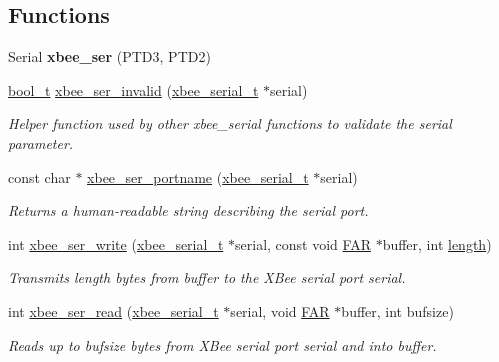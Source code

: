 \subsection*{Functions}
\begin{DoxyCompactItemize}
\item 
\mbox{\label{group__hal__kl25_ga2db648c8306d8b82c5e548096738428f}} 
Serial {\bfseries xbee\+\_\+ser} (P\+T\+D3, P\+T\+D2)
\item 
\hyperlink{group__hal__dos_ga04dd5074964518403bf944f2b240a5f8}{bool\+\_\+t} \hyperlink{group__hal__kl25_ga9bf21a5b024e4919bbe8b605c8f45351}{xbee\+\_\+ser\+\_\+invalid} (\hyperlink{structxbee__serial__t}{xbee\+\_\+serial\+\_\+t} $\ast$serial)
\begin{DoxyCompactList}\small\item\em Helper function used by other xbee\+\_\+serial functions to validate the {\itshape serial} parameter. \end{DoxyCompactList}\item 
const char $\ast$ \hyperlink{group__hal__kl25_ga898057d1b7645785e7f3d6256828d039}{xbee\+\_\+ser\+\_\+portname} (\hyperlink{structxbee__serial__t}{xbee\+\_\+serial\+\_\+t} $\ast$serial)
\begin{DoxyCompactList}\small\item\em Returns a human-\/readable string describing the serial port. \end{DoxyCompactList}\item 
int \hyperlink{group__hal__kl25_ga2ca4e60c9d642084afa52dff9e1f6be4}{xbee\+\_\+ser\+\_\+write} (\hyperlink{structxbee__serial__t}{xbee\+\_\+serial\+\_\+t} $\ast$serial, const void \hyperlink{group__hal_gaef060b3456fdcc093a7210a762d5f2ed}{F\+AR} $\ast$buffer, int \hyperlink{group__zdo_gab2b3adeb2a67e656ff030b56727fd0ac}{length})
\begin{DoxyCompactList}\small\item\em Transmits {\itshape length} bytes from {\itshape buffer} to the X\+Bee serial port {\itshape serial}. \end{DoxyCompactList}\item 
int \hyperlink{group__hal__kl25_ga8263312373c03a79a718142e051b3342}{xbee\+\_\+ser\+\_\+read} (\hyperlink{structxbee__serial__t}{xbee\+\_\+serial\+\_\+t} $\ast$serial, void \hyperlink{group__hal_gaef060b3456fdcc093a7210a762d5f2ed}{F\+AR} $\ast$buffer, int bufsize)
\begin{DoxyCompactList}\small\item\em Reads up to {\itshape bufsize} bytes from X\+Bee serial port {\itshape serial} and into {\itshape buffer}. \end{DoxyCompactList}\item 

\end{DoxyCompactItemize}
